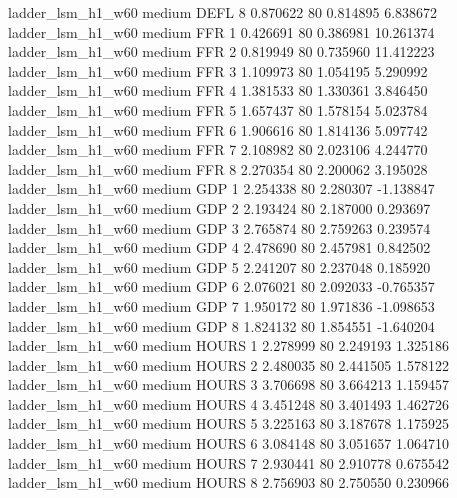   ladder_lsm_h1_w60     medium     DEFL                 8  0.870622 80       0.814895           6.838672
  ladder_lsm_h1_w60     medium      FFR                 1  0.426691 80       0.386981          10.261374
  ladder_lsm_h1_w60     medium      FFR                 2  0.819949 80       0.735960          11.412223
  ladder_lsm_h1_w60     medium      FFR                 3  1.109973 80       1.054195           5.290992
  ladder_lsm_h1_w60     medium      FFR                 4  1.381533 80       1.330361           3.846450
  ladder_lsm_h1_w60     medium      FFR                 5  1.657437 80       1.578154           5.023784
  ladder_lsm_h1_w60     medium      FFR                 6  1.906616 80       1.814136           5.097742
  ladder_lsm_h1_w60     medium      FFR                 7  2.108982 80       2.023106           4.244770
  ladder_lsm_h1_w60     medium      FFR                 8  2.270354 80       2.200062           3.195028
  ladder_lsm_h1_w60     medium      GDP                 1  2.254338 80       2.280307          -1.138847
  ladder_lsm_h1_w60     medium      GDP                 2  2.193424 80       2.187000           0.293697
  ladder_lsm_h1_w60     medium      GDP                 3  2.765874 80       2.759263           0.239574
  ladder_lsm_h1_w60     medium      GDP                 4  2.478690 80       2.457981           0.842502
  ladder_lsm_h1_w60     medium      GDP                 5  2.241207 80       2.237048           0.185920
  ladder_lsm_h1_w60     medium      GDP                 6  2.076021 80       2.092033          -0.765357
  ladder_lsm_h1_w60     medium      GDP                 7  1.950172 80       1.971836          -1.098653
  ladder_lsm_h1_w60     medium      GDP                 8  1.824132 80       1.854551          -1.640204
  ladder_lsm_h1_w60     medium    HOURS                 1  2.278999 80       2.249193           1.325186
  ladder_lsm_h1_w60     medium    HOURS                 2  2.480035 80       2.441505           1.578122
  ladder_lsm_h1_w60     medium    HOURS                 3  3.706698 80       3.664213           1.159457
  ladder_lsm_h1_w60     medium    HOURS                 4  3.451248 80       3.401493           1.462726
  ladder_lsm_h1_w60     medium    HOURS                 5  3.225163 80       3.187678           1.175925
  ladder_lsm_h1_w60     medium    HOURS                 6  3.084148 80       3.051657           1.064710
  ladder_lsm_h1_w60     medium    HOURS                 7  2.930441 80       2.910778           0.675542
  ladder_lsm_h1_w60     medium    HOURS                 8  2.756903 80       2.750550           0.230966
